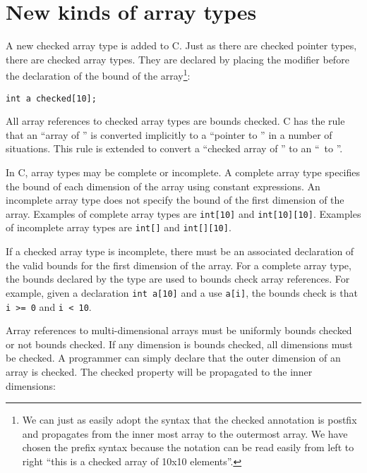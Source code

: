 \section{New kinds of array types}


A new checked array type is added to C. Just as there are checked pointer
types, there are checked array types. They are declared by placing the
modifier  before the declaration of the bound of the
array\footnote{We can just as easily adopt the syntax that the checked
annotation is postfix and propagates from the inner most array to the
 outermost array. We have chosen the prefix syntax because the notation
 can be read easily from left to right ``this is a checked array of
 10x10 elements''.}:
\begin{lstlisting}
int a checked[10];
\end{lstlisting}

All array references to checked array types are bounds checked. C has
the rule that an ``array of '' is converted implicitly to a
``pointer to '' in a number of situations. This rule is extended
to convert a ``checked array of '' to an ``\arrayptr\
to ''.

In C, array types may be complete or incomplete. A complete array type
specifies the bound of each dimension of the array using constant
expressions. An incomplete array type does not specify the bound of the
first dimension of the array. Examples of complete array types are
\lstinline+int[10]+ and \lstinline+int[10][10]+. Examples of
incomplete array types are \lstinline+int[]+ and \lstinline+int[][10]+.

If a checked array type is incomplete, there must be an associated
declaration of the valid bounds for the first dimension of the array.
For a complete array type, the bounds declared by the type are used to
bounds check array references. For example, given a declaration
\lstinline{int a[10]} and a use \lstinline{a[i]}, the bounds check is
that \lstinline{i >= 0} and \lstinline{i < 10}.

Array references to multi-dimensional arrays must be uniformly bounds
checked or not bounds checked. If any dimension is bounds checked, all
dimensions must be checked. A programmer can simply declare that
the outer dimension of an array is checked.  The checked property will be
propagated to the inner dimensions:


